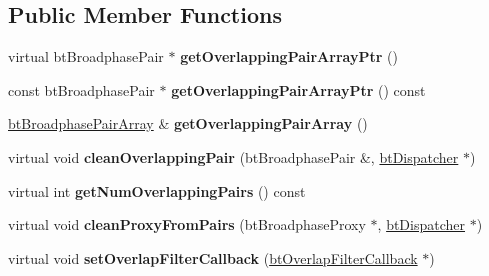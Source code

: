 \subsection*{Public Member Functions}
\begin{DoxyCompactItemize}
\item 
\hypertarget{classbt_null_pair_cache_a4ec1efad728fc0578fb780d1b99a4fe3}{virtual bt\+Broadphase\+Pair $\ast$ {\bfseries get\+Overlapping\+Pair\+Array\+Ptr} ()}\label{classbt_null_pair_cache_a4ec1efad728fc0578fb780d1b99a4fe3}

\item 
\hypertarget{classbt_null_pair_cache_a8f756d05348b5eff55647a6fdaf3a398}{const bt\+Broadphase\+Pair $\ast$ {\bfseries get\+Overlapping\+Pair\+Array\+Ptr} () const }\label{classbt_null_pair_cache_a8f756d05348b5eff55647a6fdaf3a398}

\item 
\hypertarget{classbt_null_pair_cache_ae5be2cc230e27881fd04fe1da320c7fe}{\hyperlink{classbt_aligned_object_array}{bt\+Broadphase\+Pair\+Array} \& {\bfseries get\+Overlapping\+Pair\+Array} ()}\label{classbt_null_pair_cache_ae5be2cc230e27881fd04fe1da320c7fe}

\item 
\hypertarget{classbt_null_pair_cache_a20b534e589edacd12ddf52124535c2cc}{virtual void {\bfseries clean\+Overlapping\+Pair} (bt\+Broadphase\+Pair \&, \hyperlink{classbt_dispatcher}{bt\+Dispatcher} $\ast$)}\label{classbt_null_pair_cache_a20b534e589edacd12ddf52124535c2cc}

\item 
\hypertarget{classbt_null_pair_cache_ada6a97da60db4b6c1ce73c6ac5821b20}{virtual int {\bfseries get\+Num\+Overlapping\+Pairs} () const }\label{classbt_null_pair_cache_ada6a97da60db4b6c1ce73c6ac5821b20}

\item 
\hypertarget{classbt_null_pair_cache_ae8dd727539fe9ca3d6380557a925cd1f}{virtual void {\bfseries clean\+Proxy\+From\+Pairs} (bt\+Broadphase\+Proxy $\ast$, \hyperlink{classbt_dispatcher}{bt\+Dispatcher} $\ast$)}\label{classbt_null_pair_cache_ae8dd727539fe9ca3d6380557a925cd1f}

\item 
\hypertarget{classbt_null_pair_cache_a5c1cb3394936c0fddddb19a3be8241a3}{virtual void {\bfseries set\+Overlap\+Filter\+Callback} (\hyperlink{structbt_overlap_filter_callback}{bt\+Overlap\+Filter\+Callback} $\ast$)}\label{classbt_null_pair_cache_a5c1cb3394936c0fddddb19a3be8241a3}


\end{DoxyCompactItemize}
